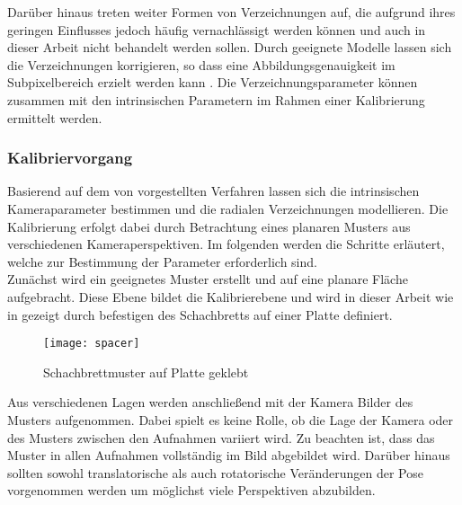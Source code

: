 
Darüber hinaus treten weiter Formen von Verzeichnungen auf, die aufgrund ihres geringen Einflusses jedoch häufig vernachlässigt werden können und auch in dieser Arbeit nicht behandelt werden sollen. Durch geeignete Modelle lassen sich die Verzeichnungen \red[softwareseitig] korrigieren, so dass eine Abbildungsgenauigkeit im Subpixelbereich erzielt werden kann \red[\cite{}]. Die Verzeichnungsparameter können zusammen mit den intrinsischen Parametern im Rahmen einer Kalibrierung ermittelt werden. 

\subsubsection{Kalibriervorgang}
Basierend auf dem von  vorgestellten Verfahren lassen sich die intrinsischen Kameraparameter bestimmen und die radialen Verzeichnungen modellieren. Die Kalibrierung erfolgt dabei durch Betrachtung eines planaren Musters aus verschiedenen Kameraperspektiven. Im folgenden werden die Schritte erläutert, welche zur Bestimmung der Parameter erforderlich sind.\\

Zunächst wird ein geeignetes Muster erstellt und auf eine planare Fläche aufgebracht. Diese Ebene bildet die Kalibrierebene und wird in dieser Arbeit wie in  gezeigt durch befestigen des Schachbretts auf einer Platte definiert. 

\begin{figure}[ht]
	\begin{center}
		\texttt{[image: spacer]}
		\caption{Schachbrettmuster auf Platte geklebt}
		\label{fig.chesscalib}
	\end{center}
\end{figure}

Aus verschiedenen Lagen werden anschließend mit der Kamera Bilder des Musters aufgenommen. Dabei spielt es keine Rolle, ob die Lage der Kamera oder des Musters zwischen den Aufnahmen variiert wird. Zu beachten ist, dass das Muster in allen Aufnahmen vollständig im Bild abgebildet wird. Darüber hinaus sollten sowohl translatorische als auch rotatorische Veränderungen der Pose vorgenommen werden um möglichst viele Perspektiven abzubilden. \\

